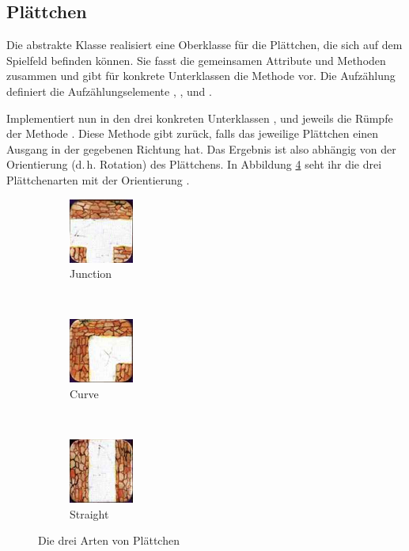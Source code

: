 \documentclass{pi-aufgabenblatt}
\newcommand{\dH}{\mbox{d.\,h.}\xspace}
\begin{document}
\subsection{Plättchen }
Die abstrakte Klasse  realisiert eine Oberklasse für die Plättchen, die sich auf dem Spielfeld befinden 
können. Sie fasst die gemeinsamen Attribute und Methoden zusammen und gibt für konkrete Unterklassen die Methode 
 vor. Die Aufzählung  definiert die Aufzählungselemente 
, ,  und .

Implementiert nun in den drei konkreten Unterklassen ,  und 
 jeweils die Rümpfe der Methode . Diese 
Methode gibt  zurück, falls das jeweilige Plättchen einen Ausgang in der gegebenen Richtung hat.
Das Ergebnis ist also abhängig von der Orientierung (\dH Rotation) des Plättchens. In 
Abbildung \ref{plaettchenarten} seht ihr die drei Plättchenarten mit der Orientierung .

\begin{figure}[ht]
        \centering
        \begin{subfigure}[b]{0.2\textwidth}
                \includegraphics{tplaettchen0.png}
                \caption{Junction}
                \label{fig:tplaettchen0}
        \end{subfigure}
        ~ 
        \begin{subfigure}[b]{0.2\textwidth}
                \includegraphics{kurve0.png}
                \caption{Curve}
                \label{fig:kurve}
        \end{subfigure}
        ~ 
        \begin{subfigure}[b]{0.2\textwidth}
                \includegraphics{gerade0.png}
                \caption{Straight}
                \label{fig:gerade}
        \end{subfigure}
        \caption{Die drei Arten von Plättchen}\label{plaettchenarten}
\end{figure}
\end{document}
